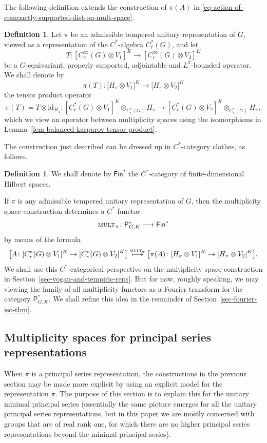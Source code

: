 \documentclass[leqno,11pt]{amsart}
\numberwithin{equation}{subsection}
\theoremstyle{plain}
\theoremstyle{definition}
\newtheorem{definition}[equation]{Definition}
\theoremstyle{remark}
\newcommand{\PSDO}{\mathsf{P}}
\newcommand{\Fin}{\mathsf{Fin}}
\newcommand{\mult}{{\textsc{\textsf{mult}}}}
\begin{document}
The following definition extends the construction of $\pi(A)$ in \eqref{eq-action-of-compactly-supported-dist-on-mult-space}. 

\begin{definition}
 Let $\pi$ be an admissible tempered unitary representation of $G$, viewed as a representation of the $C^*$-algebra $C^*_r (G)$, and let 
\[
T \colon [C_c^\infty (G)\otimes V_1]^K  \longrightarrow [C_c^\infty (G)\otimes V_2]^K 
\]
be a  $G$-equivariant, properly supported, adjointable and $L^2$-bounded operator. We shall denote by 
\[
 \pi(T)  \colon 
 \bigl [ H_\pi \otimes V_1\bigr ] ^K
 \longrightarrow 
\bigl [ H_\pi \otimes V_2\bigr ] ^K
\]
the  tensor product operator
\[
 \pi(T)= T\otimes \mathrm{id}_{H_\pi} \colon 
 [C_r^*   (G)\otimes V_1]^K\otimes _{C^*_r(G)} H_\pi
 \longrightarrow 
  [C_r^*   (G)\otimes V_2]^K \otimes _{C^*_r(G)} H_\pi ,
\]
which we view an operator between multiplicity spaces using the isomorphisms in Lemma~\ref{lem-balanced-kasparov-tensor-product}. 
\end{definition}

The construction just described can be dressed up in $C^*$-category clothes, as follows. 

\begin{definition} 
We shall denote by $\Fin^*$ the $C^*$-category of finite-dimen\-sional Hilbert spaces.
\end{definition}

If $\pi$ is any admissible tempered unitary representation of $G$, then the multiplicity space construction determines a $C^*$-functor
\begin{equation}
    \label{eq-def-of-mult-pi}
\mult_\pi\colon \PSDO^*_{G,K}\longrightarrow \Fin ^*
\end{equation}
by means of the formula 
\[
\bigl [ A\colon [C^*_r (G)\otimes V_1]^K
\to [C^*_r(G)\otimes V_2]^K\bigr ] 
\stackrel{\mult_\pi}\longmapsto 
\bigl [ \pi(A)\colon [H_\pi \otimes V_1]^K
\to [H_\pi \otimes V_2]^K\bigr ] .
\]
We shall use this $C^*$-categorical perspective on the  multiplicity space construction  in Section~\ref{sec-vogan-and-tempiric-reps}. But for now, roughly speaking, we may viewing the family of all multiplicity functors as a Fourier transform for the category $\PSDO^*_{G,K}$.  We shall refine this idea in   the remainder of Section~\ref{sec-fourier-iso-thm}. 





 \subsection{Multiplicity spaces for principal series representations}
 \label{subsec-multiplicity-spaces-for-principal-series}
When $\pi$ is a principal series representation, the constructions in the previous section may be made more explicit  by using an explicit model for the representation $\pi$.  The purpose of this section is to explain this for the unitary minimal principal series  (essentially the same picture emerges for all the unitary principal series representations, but in this paper we are mostly concerned with groups that are of real rank one, for which there are no higher principal series representations beyond the minimal principal series).
\end{document}
